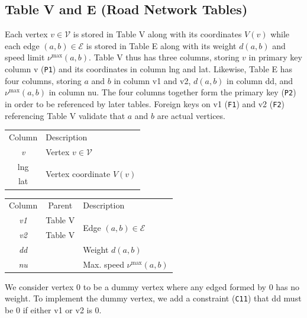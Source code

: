 \subsection{Table V and E (Road Network Tables)}
Each vertex $v\in\mathcal{V}$ is stored in Table V along with its coordinates
$V(v)$ while each edge $(a,b)\in\mathcal{E}$ is stored in Table E along with
its weight $d(a,b)$ and speed limit $\nu^\textrm{max}(a,b)$.  Table V thus has
three columns, storing $v$ in primary key column \textsf{v} ({\tt{}P1}) and its
coordinates in column \textsf{lng} and \textsf{lat}.  Likewise, Table E has
four columns, storing $a$ and $b$ in column \textsf{v1} and \textsf{v2},
$d(a,b)$ in column \textsf{dd}, and $\nu^\textrm{max}(a,b)$ in column
\textsf{nu}.  The four columns together form the primary key ({\tt{}P2}) in order
to be referenced by later tables.  Foreign keys on \textsf{v1} ({\tt{}F1}) and
\textsf{v2} ({\tt{}F2}) referencing Table V validate that $a$ and $b$ are actual
vertices.
\begin{table}[h]
\centering
\small
\begin{tabular}{|c|l|}
\hline
\rowcolor{TableTitle}
\multicolumn{2}{|c|}{Table V (Vertices)}\\
\hline
\rowcolor{TableHeader}
Column & Description\\
\hline
\textit{v} & Vertex $v\in\mathcal{V}$\\
\hline
lng & \multirow{2}{*}{Vertex coordinate $V(v)$}\\
lat & \\
\hline
\end{tabular}
\begin{tabular}{|c|c|l|}
\hline
\rowcolor{TableTitle}
\multicolumn{3}{|c|}{Table E (Edges)}\\
\hline
\rowcolor{TableHeader}
Column & Parent & Description\\
\hline
\textit{v1} & Table V & \multirow{2}{*}{Edge $(a, b)\in\mathcal{E}$} \\
\cline{2-2}
\textit{v2} & Table V & \\
\hline
\textit{dd} & & Weight $d(a,b)$\\
\hline
\textit{nu} & & Max. speed $\nu^\textrm{max}(a,b)$\\
\hline
\end{tabular}
\end{table}
We consider vertex 0 to be a dummy vertex where any edged formed by 0 has no
weight. To implement the dummy vertex, we add a constraint ({\tt{}C11}) that
\textsf{dd} must be 0 if either \textsf{v1} or \textsf{v2} is 0.

